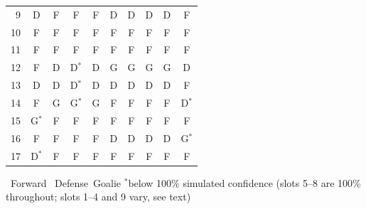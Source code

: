 \documentclass[11pt, a4paper]{article}
\begin{document}
\begin{table}[H]
{\begin{tabular}{r *{9}{c}}
9 & \cellcolor{defcolor}D & \cellcolor{fwdcolor}F & \cellcolor{fwdcolor}F & \cellcolor{fwdcolor}F & \cellcolor{defcolor}D & \cellcolor{defcolor}D & \cellcolor{defcolor}D & \cellcolor{defcolor}D & \cellcolor{fwdcolor}F \\
10 & \cellcolor{fwdcolor}F & \cellcolor{fwdcolor}F & \cellcolor{fwdcolor}F & \cellcolor{fwdcolor}F & \cellcolor{fwdcolor}F & \cellcolor{fwdcolor}F & \cellcolor{fwdcolor}F & \cellcolor{fwdcolor}F & \cellcolor{fwdcolor}F \\
11 & \cellcolor{fwdcolor}F & \cellcolor{fwdcolor}F & \cellcolor{fwdcolor}F & \cellcolor{fwdcolor}F & \cellcolor{fwdcolor}F & \cellcolor{fwdcolor}F & \cellcolor{fwdcolor}F & \cellcolor{fwdcolor}F & \cellcolor{fwdcolor}F \\
12 & \cellcolor{fwdcolor}F & \cellcolor{defcolor}D & \cellcolor{defcolor}D$^*$ & \cellcolor{defcolor}D & \cellcolor{goalcolor}G & \cellcolor{goalcolor}G & \cellcolor{goalcolor}G & \cellcolor{goalcolor}G & \cellcolor{defcolor}D \\
13 & \cellcolor{defcolor}D & \cellcolor{defcolor}D & \cellcolor{defcolor}D$^*$ & \cellcolor{defcolor}D & \cellcolor{defcolor}D & \cellcolor{defcolor}D & \cellcolor{defcolor}D & \cellcolor{defcolor}D & \cellcolor{fwdcolor}F \\
14 & \cellcolor{fwdcolor}F & \cellcolor{goalcolor}G & \cellcolor{goalcolor}G$^*$ & \cellcolor{goalcolor}G & \cellcolor{fwdcolor}F & \cellcolor{fwdcolor}F & \cellcolor{fwdcolor}F & \cellcolor{fwdcolor}F & \cellcolor{defcolor}D$^*$ \\
15 & \cellcolor{goalcolor}G$^*$ & \cellcolor{fwdcolor}F & \cellcolor{fwdcolor}F & \cellcolor{fwdcolor}F & \cellcolor{fwdcolor}F & \cellcolor{fwdcolor}F & \cellcolor{fwdcolor}F & \cellcolor{fwdcolor}F & \cellcolor{fwdcolor}F \\
16 & \cellcolor{fwdcolor}F & \cellcolor{fwdcolor}F & \cellcolor{fwdcolor}F & \cellcolor{fwdcolor}F & \cellcolor{defcolor}D & \cellcolor{defcolor}D & \cellcolor{defcolor}D & \cellcolor{defcolor}D & \cellcolor{goalcolor}G$^*$ \\
17 & \cellcolor{defcolor}D$^*$ & \cellcolor{fwdcolor}F & \cellcolor{fwdcolor}F & \cellcolor{fwdcolor}F & \cellcolor{fwdcolor}F & \cellcolor{fwdcolor}F & \cellcolor{fwdcolor}F & \cellcolor{fwdcolor}F & \cellcolor{fwdcolor}F \\
\bottomrule
\end{tabular}}

\vspace{4pt}
{\footnotesize \colorbox{fwdcolor}{\phantom{F}}~Forward\quad
  \colorbox{defcolor}{\phantom{F}}~Defense\quad \colorbox{goalcolor}{\phantom{F}}~Goalie\quad
  $^*$below 100\% simulated confidence (slots 5--8 are 100\% throughout; slots 1--4 and 9 vary,
  see text)\par}
\end{table}
\end{document}
